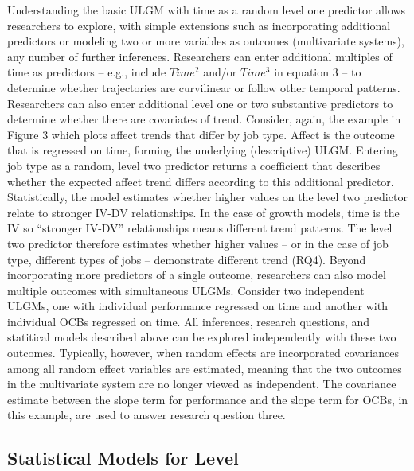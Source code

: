 \documentclass[english,,man]{apa6}
\theoremstyle{definition}
\theoremstyle{definition}
\theoremstyle{definition}
\theoremstyle{remark}
\begin{document}
Understanding the basic ULGM with time as a random level one predictor
allows researchers to explore, with simple extensions such as
incorporating additional predictors or modeling two or more variables as
outcomes (multivariate systems), any number of further inferences.
Researchers can enter additional multiples of time as predictors --
e.g., include \(Time^2\) and/or \(Time^3\) in equation 3 -- to determine
whether trajectories are curvilinear or follow other temporal patterns.
Researchers can also enter additional level one or two substantive
predictors to determine whether there are covariates of trend. Consider,
again, the example in Figure 3 which plots affect trends that differ by
job type. Affect is the outcome that is regressed on time, forming the
underlying (descriptive) ULGM. Entering job type as a random, level two
predictor returns a coefficient that describes whether the expected
affect trend differs according to this additional predictor.
Statistically, the model estimates whether higher values on the level
two predictor relate to stronger IV-DV relationships. In the case of
growth models, time is the IV so \enquote{stronger IV-DV} relationships
means different trend patterns. The level two predictor therefore
estimates whether higher values -- or in the case of job type, different
types of jobs -- demonstrate different trend (RQ4). Beyond incorporating
more predictors of a single outcome, researchers can also model multiple
outcomes with simultaneous ULGMs. Consider two independent ULGMs, one
with individual performance regressed on time and another with
individual OCBs regressed on time. All inferences, research questions,
and statitical models described above can be explored independently with
these two outcomes. Typically, however, when random effects are
incorporated covariances among all random effect variables are
estimated, meaning that the two outcomes in the multivariate system are
no longer viewed as independent. The covariance estimate between the
slope term for performance and the slope term for OCBs, in this example,
are used to answer research question three.

\hypertarget{statistical-models-for-level}{%
\subsection{Statistical Models for
Level}\label{statistical-models-for-level}}
\end{document}
